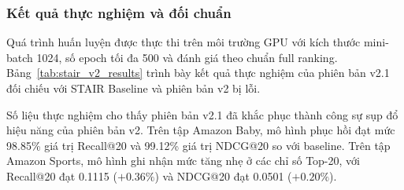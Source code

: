 \subsubsection{Kết quả thực nghiệm và đối chuẩn}

Quá trình huấn luyện được thực thi trên môi trường GPU với kích thước mini-batch 1024, số epoch tối đa 500 và đánh giá theo chuẩn full ranking. Bảng~\ref{tab:stair_v2_results} trình bày kết quả thực nghiệm của phiên bản v2.1 đối chiếu với STAIR Baseline và phiên bản v2 bị lỗi.

\begin{table}[H]
\centering
\small
\setlength{\tabcolsep}{4.5pt}
\renewcommand{\arraystretch}{1.15}
\caption{Kết quả thực nghiệm của STAIR-BCCR v2.1 so với Baseline và phiên bản v2 trên hai tập dữ liệu.}
\label{tab:stair_v2_results}
\end{table}

Số liệu thực nghiệm cho thấy phiên bản v2.1 đã khắc phục thành công sự sụp đổ hiệu năng của phiên bản v2. Trên tập Amazon Baby, mô hình phục hồi đạt mức 98.85\% giá trị Recall@20 và 99.12\% giá trị NDCG@20 so với baseline. Trên tập Amazon Sports, mô hình ghi nhận mức tăng nhẹ ở các chỉ số Top-20, với Recall@20 đạt 0.1115 ($+0.36\%$) và NDCG@20 đạt 0.0501 ($+0.20\%$). 

